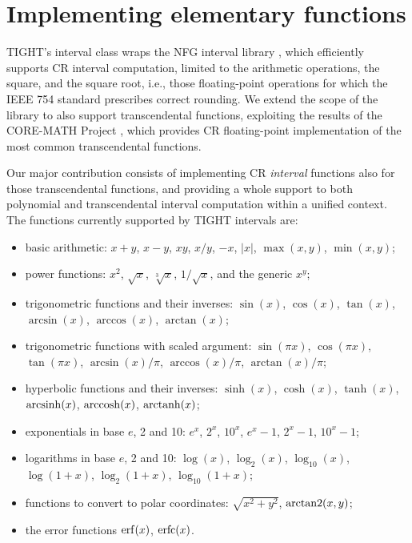 
\section{Implementing elementary functions}
\label{sec:functions}
TIGHT's interval class wraps the NFG interval library \cite{nfg}, which efficiently supports CR interval computation, limited to the arithmetic operations, the square, and the square root, i.e., those floating-point operations for which the IEEE 754 standard prescribes correct rounding. 
We extend the scope of the library to also support transcendental functions, exploiting the results of the CORE-MATH Project \cite{Sibidanov2022}, which provides CR floating-point implementation of the most common transcendental functions.

Our major contribution consists of implementing CR \emph{interval} functions also for those transcendental functions, and providing a whole support to both polynomial and transcendental interval computation within a unified context. 
The functions currently supported by TIGHT intervals are:
\begin{itemize}
	\item basic arithmetic: $x+y$, $x-y$, $xy$, $x/y$, $-x$, $|x|$, $\max(x,y)$, $\min(x,y)$;
	\item power functions: $x^2$, $\sqrt{x}$, $\sqrt[3]{x}$, $1/\sqrt{x}$, and the generic $x^y$;
	\item trigonometric functions and their inverses: $\sin(x)$, $\cos(x)$, $\tan(x)$, $\arcsin(x)$, $\arccos(x)$, $\arctan(x)$;
	\item trigonometric functions with scaled argument: $\sin(\pi x)$, $\cos(\pi x)$, $\tan(\pi x)$, $\arcsin(x)/\pi$, $\arccos(x)/\pi$, $\arctan(x)/\pi$;
	\item hyperbolic functions and their inverses: $\sinh(x)$, $\cosh(x)$, $\tanh(x)$, $\operatorname{arcsinh}(x)$, $\operatorname{arccosh}(x)$, $\operatorname{arctanh}(x)$;
	\item exponentials in base $e$, 2 and 10: $e^x$, $2^x$, $10^x$, $e^x-1$, $2^x-1$, $10^x-1$;
	\item logarithms in base $e$, 2 and 10: $\log(x)$, $\log_2(x)$, $\log_{10}(x)$, $\log(1+x)$, $\log_2(1+x)$, $\log_{10}(1+x)$;
	\item functions to convert to polar coordinates: $\sqrt{x^2+y^2}$, $\operatorname{arctan2}(x,y)$;
	\item the error functions $\operatorname{erf}(x)$, $\operatorname{erfc}(x)$.
\end{itemize}

